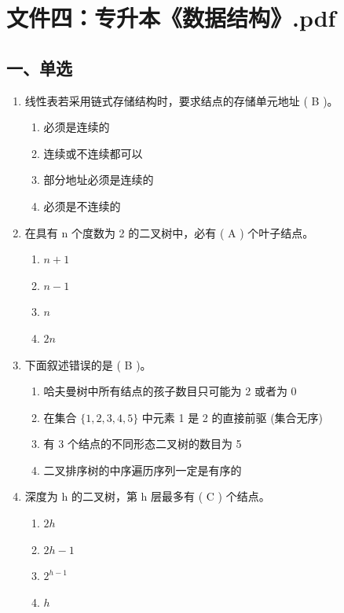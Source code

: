 \documentclass[12pt, a4paper]{article}
\begin{document}
\section{文件四：专升本《数据结构》.pdf}

\subsection*{一、单选}

\begin{enumerate}[label=\arabic*.]
    \item 线性表若采用链式存储结构时，要求结点的存储单元地址 ( B )。
    \begin{enumerate}
        \item 必须是连续的
        \item 连续或不连续都可以
        \item 部分地址必须是连续的
        \item 必须是不连续的
    \end{enumerate}

    \item 在具有 n 个度数为 2 的二叉树中，必有 ( A ) 个叶子结点。
    \begin{enumerate}
        \item $n+1$
        \item $n-1$
        \item $n$
        \item $2n$
    \end{enumerate}

    \item 下面叙述错误的是 ( B )。
    \begin{enumerate}
        \item 哈夫曼树中所有结点的孩子数目只可能为 2 或者为 0
        \item 在集合 $\{1, 2, 3, 4, 5\}$ 中元素 1 是 2 的直接前驱 (集合无序)
        \item 有 3 个结点的不同形态二叉树的数目为 5
        \item 二叉排序树的中序遍历序列一定是有序的
    \end{enumerate}

    \item 深度为 h 的二叉树，第 h 层最多有 ( C ) 个结点。
    \begin{enumerate}
        \item $2h$
        \item $2h-1$
        \item $2^{h-1}$
        \item $h$
    \end{enumerate}


\end{enumerate}
\end{document}
